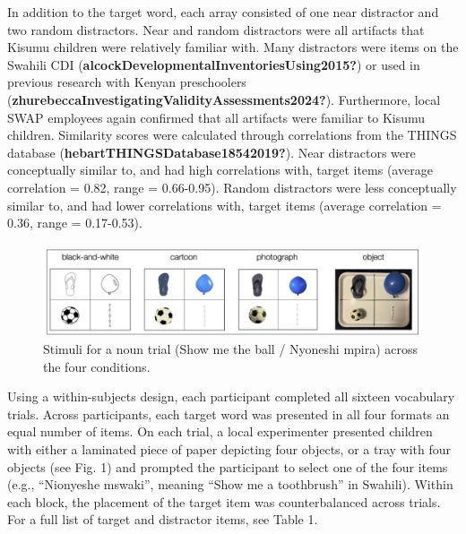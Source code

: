 \documentclass[10pt, letterpaper]{article}
\begin{document}
In addition to the target word, each array consisted of one near
distractor and two random distractors. Near and random distractors were
all artifacts that Kisumu children were relatively familiar with. Many
distractors were items on the Swahili CDI
(\textbf{alcockDevelopmentalInventoriesUsing2015?}) or used in previous
research with Kenyan preschoolers
(\textbf{zhurebeccaInvestigatingValidityAssessments2024?}). Furthermore,
local SWAP employees again confirmed that all artifacts were familiar to
Kisumu children. Similarity scores were calculated through correlations
from the THINGS database (\textbf{hebartTHINGSDatabase18542019?}). Near
distractors were conceptually similar to, and had high correlations
with, target items (average correlation = 0.82, range = 0.66-0.95).
Random distractors were less conceptually similar to, and had lower
correlations with, target items (average correlation = 0.36, range =
0.17-0.53).

\begin{CodeChunk}
\begin{figure}[tb]

{\centering \includegraphics[width=6in]{fig1} 

}

\caption[Stimuli for a noun trial (Show me the ball / Nyoneshi mpira) across the four conditions]{Stimuli for a noun trial (Show me the ball / Nyoneshi mpira) across the four conditions.}\label{fig:figure1}
\end{figure}
\end{CodeChunk}

Using a within-subjects design, each participant completed all sixteen
vocabulary trials. Across participants, each target word was presented
in all four formats an equal number of items. On each trial, a local
experimenter presented children with either a laminated piece of paper
depicting four objects, or a tray with four objects (see Fig. 1) and
prompted the participant to select one of the four items (e.g.,
``Nionyeshe mswaki'', meaning ``Show me a toothbrush'' in Swahili).
Within each block, the placement of the target item was counterbalanced
across trials. For a full list of target and distractor items, see Table
1.
\end{document}
